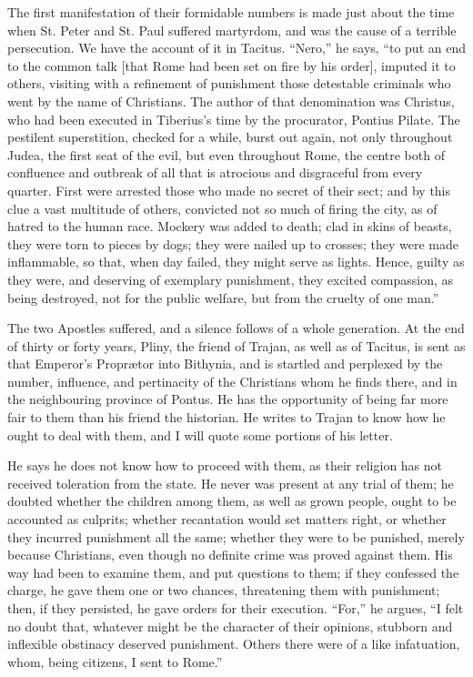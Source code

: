 The first manifestation of their formidable numbers is made just
about the time when St. Peter and St. Paul suffered martyrdom, and was
the cause of a terrible persecution. We have the account of it in
Tacitus. ``Nero,'' he says, ``to put an end to the common
talk [that Rome had been set on fire by his order], imputed it to
others, visiting with a refinement of punishment those detestable
criminals who went by the name of Christians. The author of that
denomination was Christus, who had been executed in Tiberius's time by
the procurator, Pontius Pilate. The pestilent superstition, checked
for a while, burst out again, not only throughout Judea, the first
seat of the evil, but even throughout Rome, the centre both of
confluence and outbreak of all that is atrocious and disgraceful from
every quarter. First were arrested those who made no secret of their
sect; and by this clue a vast multitude of others, convicted not
so much of firing the city, as of hatred to the human race. Mockery
was added to death; clad in skins of beasts, they were torn to pieces
by dogs; they were nailed up to crosses; they were made inflammable,
so that, when day failed, they might serve as lights. Hence, guilty as
they were, and deserving of exemplary punishment, they excited
compassion, as being destroyed, not for the public welfare, but from
the cruelty of one man.''

The two Apostles suffered, and a silence follows of a whole
generation. At the end of thirty or forty years, Pliny, the friend of
Trajan, as well as of Tacitus, is sent as that Emperor's Proprætor
into Bithynia, and is startled and perplexed by the number, influence,
and pertinacity of the Christians whom he finds there, and in the
neighbouring province of Pontus. He has the opportunity of being far
more fair to them than his friend the historian. He writes to Trajan
to know how he ought to deal with them, and I will quote some portions
of his letter.

He says he does not know how to proceed with them, as their
religion has not received toleration from the state. He never was
present at any trial of them; he doubted whether the children among
them, as well as grown people, ought to be accounted as culprits;
whether recantation would set matters right, or whether they incurred
punishment all the same; whether they were to be punished, merely
because Christians, even though no definite crime was proved against
them. His way had been to examine them, and put questions to them; if
they confessed the charge, he gave them one or two chances,
threatening them with punishment; then, if they persisted, he gave
orders for their execution. ``For,'' he argues, ``I felt
no doubt that, whatever might be the character of their opinions,
stubborn and inflexible obstinacy deserved punishment. Others there
were of a like infatuation, whom, being citizens, I sent to
Rome.''

